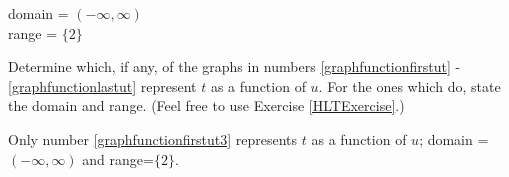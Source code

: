 \documentclass{ximera}
\begin{document}
\begin{question}
\begin{problem}
\begin{multipleChoice}
    \begin{feedback}
    \begin{solution}
domain = $(-\infty, \infty)$ \\ range = $\{2\}$
    \end{solution}
    \end{feedback}
\end{multipleChoice}
\end{problem} 
\end{question}

\begin{problem}
Determine which, if any, of the graphs in numbers \ref{graphfunctionfirstut} - \ref{graphfunctionlastut} represent $t$ as a function of $u$.  For the ones which do, state the domain and range.   (Feel free to use Exercise \ref{HLTExercise}.)

\begin{solution}
Only number \ref{graphfunctionfirstut3} represents $t$ as a function of $u$;  domain = $(-\infty, \infty)$ and range=$\{2 \}$.
\end{solution}
\end{problem} 
\end{document}
